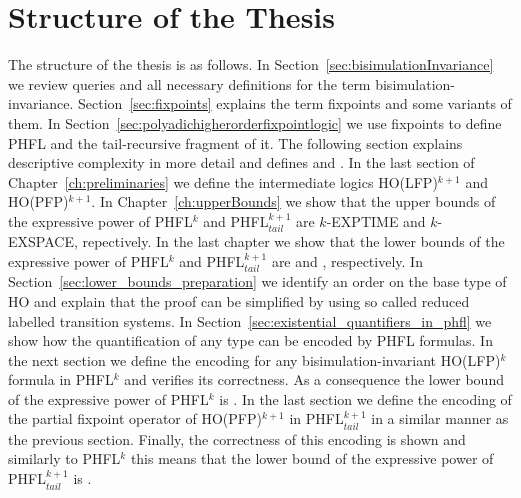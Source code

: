 \section*{Structure of the Thesis}
The structure of the thesis is as follows. In Section~\ref{sec:bisimulationInvariance} we review queries and all necessary definitions for the term bisimulation-invariance. Section~\ref{sec:fixpoints} explains the term fixpoints and some variants of them. In Section~\ref{sec:polyadichigherorderfixpointlogic} we use fixpoints to define PHFL and the tail-recursive fragment of it. The following section explains descriptive complexity in more detail and defines  and . In the last section of Chapter~\ref{ch:preliminaries} we define the intermediate logics HO(LFP)$^{k+1}$ and HO(PFP)$^{k+1}$. In Chapter~\ref{ch:upperBounds} we show that the upper bounds of the expressive power of PHFL$^k$ and PHFL$^{k+1}_{tail}$ are $k$-EXPTIME and $k$-EXSPACE, repectively. In the last chapter we show that the lower bounds of the expressive power of PHFL$^k$ and PHFL$^{k+1}_{tail}$ are  and , respectively. In Section~\ref{sec:lower_bounds_preparation} we identify an order on the base type of HO and explain that the proof can be simplified by using so called reduced labelled transition systems. In Section~\ref{sec:existential_quantifiers_in_phfl} we show how the quantification of any type can be encoded by PHFL formulas. In the next section we define the encoding for any bisimulation-invariant HO(LFP)$^k$ formula in PHFL$^k$ and verifies its correctness. As a consequence the lower bound of the expressive power of PHFL$^k$ is . In the last section we define the encoding of the partial fixpoint operator of HO(PFP)$^{k+1}$ in PHFL$^{k+1}_{tail}$ in a similar manner as the previous section. Finally, the correctness of this encoding is shown and similarly to PHFL$^k$ this means that the lower bound of the expressive power of PHFL$^{k+1}_{tail}$ is .